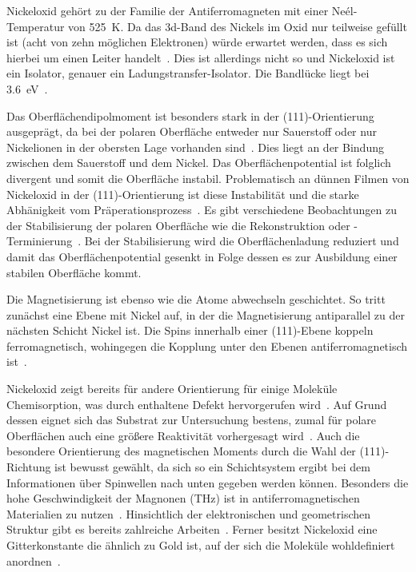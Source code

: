             Nickeloxid gehört zu der Familie der Antiferromagneten mit einer Neél-Temperatur von \SI{525}{\kelvin}.
            Da das 3d-Band des Nickels im Oxid nur teilweise gefüllt ist (acht von zehn möglichen Elektronen) würde erwartet werden, dass es sich hierbei um einen Leiter handelt~\cite{kunz_chemisorption_1985}.
            Dies ist allerdings nicht so und Nickeloxid ist ein Isolator, genauer ein Ladungstransfer-Isolator.
            Die Bandlücke liegt bei \SI{3.6}{\electronvolt}~\cite{kunz_chemisorption_1985}.

            Das Oberflächendipolmoment ist besonders stark in der (111)-Orientierung ausgeprägt, da bei der polaren Oberfläche entweder nur Sauerstoff oder nur Nickelionen in der obersten Lage vorhanden sind~\cite{NiO_8}.
            Dies liegt an der Bindung zwischen dem Sauerstoff und dem Nickel.
            Das Oberflächenpotential ist folglich divergent und somit die Oberfläche instabil.
            Problematisch an dünnen Filmen von Nickeloxid in der (111)-Orientierung ist diese Instabilität und die starke Abhänigkeit vom Präperationsprozess~\cite{NiO_36}.
            Es gibt verschiedene Beobachtungen zu der Stabilisierung der polaren Oberfläche wie die Rekonstruktion oder -Terminierung~\cite{NiO_36, NiO_35, NiO_34, NiO_27, NiO_10}.
            Bei der Stabilisierung wird die Oberflächenladung reduziert und damit das Oberflächenpotential gesenkt in Folge dessen es zur Ausbildung einer stabilen Oberfläche kommt.

            Die Magnetisierung ist ebenso wie die Atome abwechseln geschichtet.
            So tritt zunächst eine Ebene mit Nickel auf, in der die Magnetisierung antiparallel zu der nächsten Schicht Nickel ist.
            Die Spins innerhalb einer (111)-Ebene koppeln ferromagnetisch, wohingegen die Kopplung unter den Ebenen antiferromagnetisch ist~\cite{FeO_6}.

            Nickeloxid zeigt bereits für andere Orientierung für einige Moleküle Chemisorption, was durch enthaltene Defekt hervorgerufen wird~\cite{kunz_chemisorption_1985}.
            Auf Grund dessen eignet sich das Substrat zur Untersuchung bestens, zumal für polare Oberflächen auch eine größere Reaktivität vorhergesagt wird~\cite{cappus_hydroxyl_1993}.
            Auch die besondere Orientierung des magnetischen Moments durch die Wahl der (111)-Richtung ist bewusst gewählt, da sich so ein Schichtsystem ergibt bei dem Informationen über Spinwellen nach unten gegeben werden können.
            Besonders die hohe Geschwindigkeit der Magnonen (\si{\tera\hertz}) ist in antiferromagnetischen Materialien zu nutzen~\cite{AFM_5}.
            Hinsichtlich der elektronischen und geometrischen Struktur gibt es bereits zahlreiche Arbeiten~\cite{NiO_7, NiO_34, NiO_35, NiO_37, NiO_8, NiO_13}.
            Ferner besitzt Nickeloxid eine Gitterkonstante die ähnlich zu Gold ist, auf der sich die Moleküle wohldefiniert anordnen~\cite{5A_1}.
            
